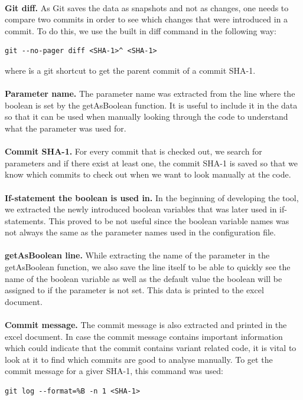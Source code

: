 \paragraph*{}
\textbf{Git diff.} As Git saves the data as snapshots and not as changes, one needs to compare two commits in order to see which changes that were introduced in a commit. To do this, we use the built in diff command in the following way:
\lstset{language=Bash}
\begin{lstlisting}[frame=single]
git --no-pager diff <SHA-1>^ <SHA-1>
\end{lstlisting}
where \^ is a git shortcut to get the parent commit of a commit SHA-1.
\paragraph*{}
\textbf{Parameter name.} The parameter name was extracted from the line where the boolean is set by the getAsBoolean function. It is useful to include it in the data so that it can be used when manually looking through the code to understand what the parameter was used for.
\paragraph*{}
\textbf{Commit SHA-1.} For every commit that is checked out, we search for parameters and if there exist at least one, the commit SHA-1 is saved so that we know which commits to check out when we want to look manually at the code.
\paragraph*{}
\textbf{If-statement the boolean is used in.} In the beginning of developing the tool, we extracted the newly introduced boolean variables that was later used in if-statements. This proved to be not useful since the boolean variable names was not always the same as the parameter names used in the configuration file.
\paragraph*{}
\textbf{getAsBoolean line.} While extracting the name of the parameter in the getAsBoolean function, we also save the line itself to be able to quickly see the name of the boolean variable as well as the default value the boolean will be assigned to if the parameter is not set. This data is printed to the excel document.
\paragraph*{}
\textbf{Commit message.} The commit message is also extracted and printed in the excel document. In case the commit message contains important information which could indicate that the commit contains variant related code, it is vital to look at it to find which commits are good to analyse manually.
To get the commit message for a giver SHA-1, this command was used:
\lstset{language=Bash}
\begin{lstlisting}[frame=single]
git log --format=%B -n 1 <SHA-1>
\end{lstlisting}

